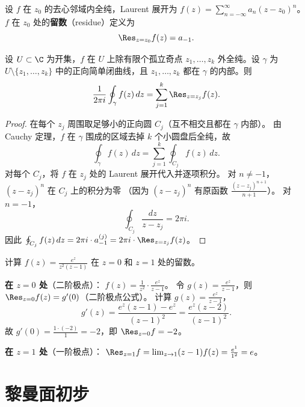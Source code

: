 \begin{definition}[留数]
\label{def:residue}
设 $f$ 在 $z_0$ 的去心邻域内全纯，Laurent 展开为
$f(z) = \sum_{n=-\infty}^{\infty} a_n(z - z_0)^n$。
$f$ 在 $z_0$ 处的\textbf{留数}（residue）定义为
\[
  \Res_{z = z_0} f(z) = a_{-1}.
\]
\end{definition}

\begin{theorem}[留数定理]
\label{thm:residue}
设 $U \subset \C$ 为开集，$f$ 在 $U$ 上除有限个孤立奇点
$z_1, \ldots, z_k$ 外全纯。设 $\gamma$ 为 $U \setminus \{z_1, \ldots, z_k\}$
中的正向简单闭曲线，且 $z_1, \ldots, z_k$ 都在 $\gamma$ 的内部。则
\[
  \frac{1}{2\pi i} \oint_\gamma f(z)\, dz
  = \sum_{j=1}^{k} \Res_{z = z_j} f(z).
\]
\end{theorem}

\begin{proof}
在每个 $z_j$ 周围取足够小的正向圆 $C_j$（互不相交且都在 $\gamma$ 内部）。
由 Cauchy 定理，$f$ 在 $\gamma$ 围成的区域去掉 $k$ 个小圆盘后全纯，故
\[
  \oint_\gamma f(z)\, dz = \sum_{j=1}^{k} \oint_{C_j} f(z)\, dz.
\]
对每个 $C_j$，将 $f$ 在 $z_j$ 处的 Laurent 展开代入并逐项积分。
对 $n \neq -1$，$(z - z_j)^n$ 在 $C_j$ 上的积分为零
（因为 $(z - z_j)^n$ 有原函数 $\frac{(z-z_j)^{n+1}}{n+1}$）。
对 $n = -1$，
\[
  \oint_{C_j} \frac{dz}{z - z_j} = 2\pi i.
\]
因此 $\oint_{C_j} f(z)\, dz = 2\pi i \cdot a_{-1}^{(j)} = 2\pi i \cdot \Res_{z=z_j} f(z)$。
\end{proof}

\begin{example}
\label{ex:residue-computation}
计算 $f(z) = \frac{e^z}{z^2(z-1)}$ 在 $z = 0$ 和 $z = 1$ 处的留数。

\textbf{在 $z = 0$ 处}（二阶极点）：
$f(z) = \frac{1}{z^2} \cdot \frac{e^z}{z - 1}$。
令 $g(z) = \frac{e^z}{z - 1}$，则
$\Res_{z=0} f(z) = g'(0)$（二阶极点公式）。
计算 $g(z) = \frac{e^z}{z-1}$，
\[
  g'(z) = \frac{e^z(z - 1) - e^z}{(z-1)^2} = \frac{e^z(z - 2)}{(z-1)^2}.
\]
故 $g'(0) = \frac{1 \cdot (-2)}{1} = -2$，即 $\Res_{z=0} f = -2$。

\textbf{在 $z = 1$ 处}（一阶极点）：
$\Res_{z=1} f = \lim_{z \to 1} (z - 1) f(z) = \frac{e^1}{1^2} = e$。
\end{example}


\section{黎曼面初步}
\label{sec:riemann-surfaces}


